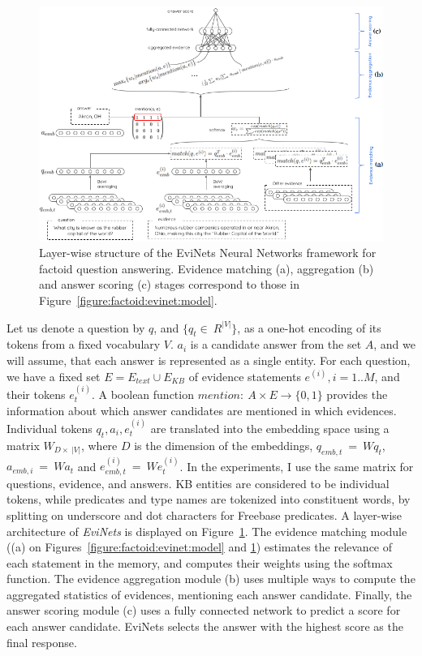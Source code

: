 \begin{figure}[t]
\centering
\includegraphics[width=\textwidth]{img/EviNetLayers}
\caption{Layer-wise structure of the EviNets Neural Networks framework for factoid question answering. Evidence matching (a), aggregation (b) and answer scoring (c) stages correspond to those in Figure~\ref{figure:factoid:evinet:model}.}
\label{figure:factoid:evinet:layers}
\end{figure}

Let us denote a question by $q$, and $\{q_t\in~R^{|V|}\}$, as a one-hot encoding of its tokens from a fixed vocabulary $V$.
$a_i$ is a candidate answer from the set $A$, and we will assume, that each answer is represented as a single entity.
For each question, we have a fixed set $E=E_{text} \cup E_{KB}$ of evidence statements $e^{(i)}, i=1..M$, and their tokens $e_t^{(i)}$.
A boolean function $mention:~A\times E\rightarrow\{0, 1\}$ provides the information about which answer candidates are mentioned in which evidences.
Individual tokens $q_t, a_i, e_t^{(i)}$ are translated into the embedding space using a matrix $W_{D\times~|V|}$, where $D$ is the dimension of the embeddings, \ie $q_{emb,t}~=~Wq_t$, $a_{emb,i}~=~Wa_t$ and $e^{(i)}_{emb,t}~=~We^{(i)}_t$.
In the experiments, I use the same matrix for questions, evidence, and answers.
KB entities are considered to be individual tokens, while predicates and type names are tokenized into constituent words, \ie by splitting on underscore and dot characters for Freebase predicates.
A layer-wise architecture of \textit{EviNets} is displayed on Figure~\ref{figure:factoid:evinet:layers}.
The evidence matching module ((a) on Figures~\ref{figure:factoid:evinet:model} and \ref{figure:factoid:evinet:layers}) estimates the relevance of each statement in the memory, and computes their weights using the softmax function.
The evidence aggregation module (b) uses multiple ways to compute the aggregated statistics of evidences, mentioning each answer candidate.
Finally, the answer scoring module (c) uses a fully connected network to predict a score for each answer candidate.
EviNets selects the answer with the highest score as the final response.

